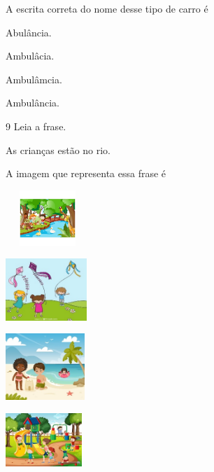 A escrita correta do nome desse tipo de carro é

\begin{escolha}
\item Abulância.

\item Ambulâcia.

\item Ambulâmcia.

\item Ambulância.
\end{escolha}

\num{9} Leia a frase.

As crianças estão no rio.

A imagem que representa essa frase é

\begin{escolha}
\item \includegraphics[width=1.25000in,height=0.82361in]{media/image154.jpeg}

\item \includegraphics[width=1.21181in,height=0.92014in]{media/image155.jpeg}

\item \includegraphics[width=1.18125in,height=0.98472in]{media/image156.jpeg}

\item \includegraphics[width=1.13611in,height=0.80208in]{media/image157.jpeg}
\end{escolha}

